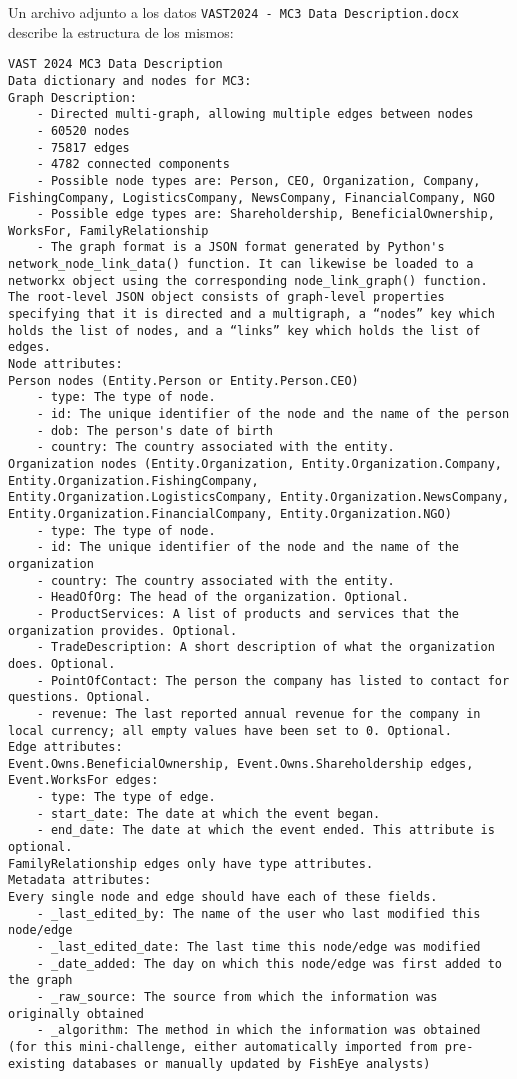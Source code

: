 \documentclass[11pt,spanish,a4paper]{article}
\begin{document}
Un archivo adjunto a los datos \verb'VAST2024 - MC3 Data Description.docx' describe la estructura de los mismos:
\begin{verbatim}
VAST 2024 MC3 Data Description
Data dictionary and nodes for MC3:
Graph Description:
    - Directed multi-graph, allowing multiple edges between nodes
    - 60520 nodes
    - 75817 edges
    - 4782 connected components
    - Possible node types are: Person, CEO, Organization, Company, FishingCompany, LogisticsCompany, NewsCompany, FinancialCompany, NGO
    - Possible edge types are: Shareholdership, BeneficialOwnership, WorksFor, FamilyRelationship
    - The graph format is a JSON format generated by Python's network_node_link_data() function. It can likewise be loaded to a networkx object using the corresponding node_link_graph() function. The root-level JSON object consists of graph-level properties specifying that it is directed and a multigraph, a “nodes” key which holds the list of nodes, and a “links” key which holds the list of edges.
Node attributes:
Person nodes (Entity.Person or Entity.Person.CEO)
    - type: The type of node.
    - id: The unique identifier of the node and the name of the person
    - dob: The person's date of birth
    - country: The country associated with the entity. 
Organization nodes (Entity.Organization, Entity.Organization.Company, Entity.Organization.FishingCompany, Entity.Organization.LogisticsCompany, Entity.Organization.NewsCompany, Entity.Organization.FinancialCompany, Entity.Organization.NGO)
    - type: The type of node.
    - id: The unique identifier of the node and the name of the organization
    - country: The country associated with the entity.
    - HeadOfOrg: The head of the organization. Optional.
    - ProductServices: A list of products and services that the organization provides. Optional.
    - TradeDescription: A short description of what the organization does. Optional.
    - PointOfContact: The person the company has listed to contact for questions. Optional.
    - revenue: The last reported annual revenue for the company in local currency; all empty values have been set to 0. Optional.
Edge attributes:
Event.Owns.BeneficialOwnership, Event.Owns.Shareholdership edges, Event.WorksFor edges:
    - type: The type of edge.
    - start_date: The date at which the event began.
    - end_date: The date at which the event ended. This attribute is optional.
FamilyRelationship edges only have type attributes.
Metadata attributes:
Every single node and edge should have each of these fields. 
    - _last_edited_by: The name of the user who last modified this node/edge
    - _last_edited_date: The last time this node/edge was modified
    - _date_added: The day on which this node/edge was first added to the graph
    - _raw_source: The source from which the information was originally obtained
    - _algorithm: The method in which the information was obtained (for this mini-challenge, either automatically imported from pre-existing databases or manually updated by FishEye analysts)
\end{verbatim}
\end{document}
